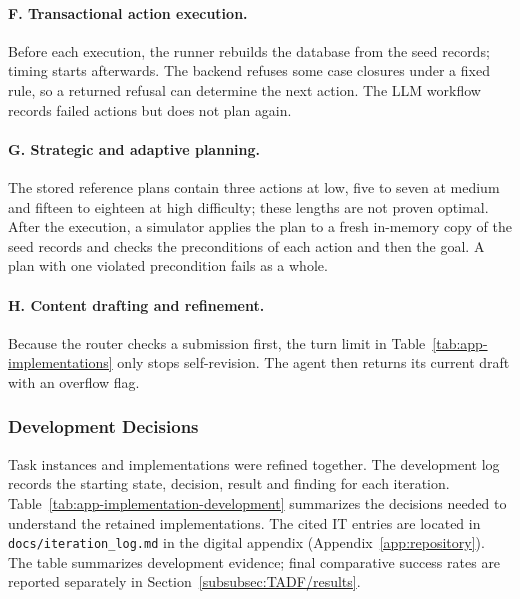 \paragraph{F. Transactional action execution.}
\label{app:implementation/f}
Before each execution, the runner rebuilds the database from the seed records; timing starts afterwards. The backend refuses some case closures under a fixed rule, so a returned refusal can determine the next action. The LLM workflow records failed actions but does not plan again.

\paragraph{G. Strategic and adaptive planning.}
\label{app:implementation/g}
The stored reference plans contain three actions at low, five to seven at medium and fifteen to eighteen at high difficulty; these lengths are not proven optimal. After the execution, a simulator applies the plan to a fresh in-memory copy of the seed records and checks the preconditions of each action and then the goal. A plan with one violated precondition fails as a whole.

\paragraph{H. Content drafting and refinement.}
\label{app:implementation/h}
Because the router checks a submission first, the turn limit in Table~\ref{tab:app-implementations} only stops self-revision. The agent then returns its current draft with an overflow flag.

\subsubsection{Development Decisions}
\label{app:protocol/development}

Task instances and implementations were refined together. The development log records the starting state, decision, result and finding for each iteration. Table~\ref{tab:app-implementation-development} summarizes the decisions needed to understand the retained implementations. The cited IT entries are located in \texttt{docs/iteration\_log.md} in the digital appendix (Appendix~\ref{app:repository}). The table summarizes development evidence; final comparative success rates are reported separately in Section~\ref{subsubsec:TADF/results}.

